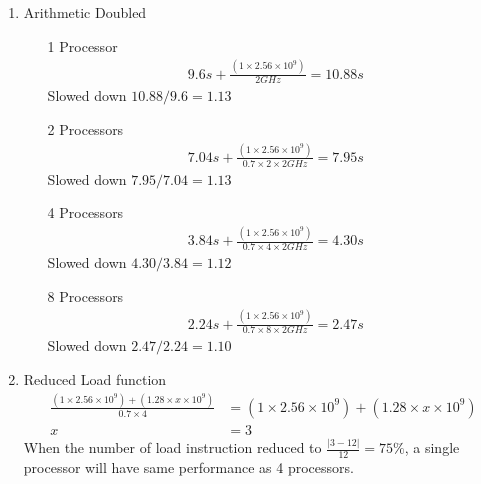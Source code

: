 \documentclass{article}
\def\math#1{$#1$}
\begin{document}
\begin{enumerate}[(1)]
    \item Arithmetic Doubled
        \begin{itemize}
            \item [1 Processor]
                 \begin{equation}
                    \begin{split}
                       9.6s + \frac{(1 \times 2.56 \times 10^9)}{2 GHz} = 10.88s
                    \end{split}
                \end{equation}
                Slowed down \math{10.88 / 9.6 = 1.13}
            \item [2 Processors]
                \begin{equation}
                    \begin{split}
                       7.04s + \frac{(1 \times 2.56 \times 10^9)}{0.7 \times 2 \times 2 GHz} = 7.95s
                    \end{split}
                \end{equation}
                Slowed down \math{7.95 / 7.04 = 1.13}
            \item [4 Processors]
                \begin{equation}
                    \begin{split}
                        3.84s + \frac{(1 \times 2.56 \times 10^9)}{0.7 \times 4 \times 2 GHz} = 4.30s
                    \end{split}
                \end{equation}
              Slowed down \math{4.30 / 3.84 = 1.12}
            \item [8 Processors]
                \begin{equation}
                    \begin{split}
                        2.24s + \frac{(1 \times 2.56 \times 10^9)}{0.7 \times 8 \times 2 GHz} = 2.47s
                    \end{split}
                \end{equation}
                Slowed down \math{2.47 / 2.24 = 1.10}
        \end{itemize}
    \item Reduced Load function
        \begin{equation}
            \begin{split}
               \frac{(1 \times 2.56 \times 10^9) + (1.28 \times x \times 10^9)}{0.7 \times 4} &= (1 \times 2.56 \times 10^9) + (1.28 \times x \times 10^9) \\
               x &= 3 
            \end{split}
        \end{equation}
        When the number of load instruction reduced to \math{\frac{|3-12|}{12} = 75\%}, a single processor will have same performance as 4 processors.
\end{enumerate}
\end{document}
